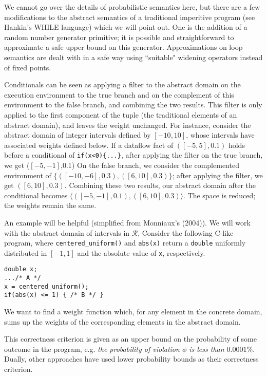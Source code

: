 We cannot go over the details of probabilistic semantics here, but there
are a few modifications to the abstract semantics of a
traditional imperitive program (see Hankin's WHILE language) 
which we will point out.
One is the addition of a random number generator primitive; it
is possible and straightforward to approximate a safe upper
bound on this generator.
Approximations on loop semantics are dealt with in a safe way
using ``suitable" widening operators instead of fixed points.

Conditionals can be seen as applying a filter to
the abstract domain on the execution environment to the
true branch and on the complement of this environment to the
false branch, and combining the two results.
This filter is only applied to the first component of
the tuple (the traditional elements of an abstract domain), 
and leaves the weight unchanged.
For instance, consider the abstract domain of integer intervals 
defined by $[-10,10]$, whose intervals have associated weights
defined below. 
If a dataflow fact of $([-5,5],0.1)$ holds before a conditional of 
{\tt if(x<0)\{...\}}, after applying the filter on the true branch, 
we get ($[-5,-1]$,0.1) 
On the false branch, we consider the complemented environment of
$\{([-10,-6],0.3),([6,10],0.3)\}$; after applying the filter, 
we get $([6,10],0.3)$.
Combining these two results, our abstract domain after the
conditional becomes $\langle([-5,-1],0.1),([6,10],0.3)\rangle$.
The space is reduced; the weights remain the same.

An example will be helpful (simplified from Monniaux's (2004)).
We will work with the abstract domain of intervals in $\mathcal{R}$,
Consider the following C-like program, where {\tt centered\_uniform()}
and {\tt abs(x)} return a {\tt double} uniformly distributed in 
$[-1,1]$ and the absolute value of {\tt x}, respectively.

{\tt double x;\\
     .../* A */\\
     x = centered\_uniform();\\
     if(abs(x) <= 1) \{ /* B */ \}}

We want to find a weight function which, for any element in the
concrete domain, sums up the weights of the corresponding elements
in the abstract domain.


This correctness criterion is given as an upper bound on the
probability of some outcome in the program, e.g. {\sl the
probability of violation $\phi$ is less than $0.0001\%$}.
Dually, other approaches have
used lower probability bounds as their correctness criterion.

